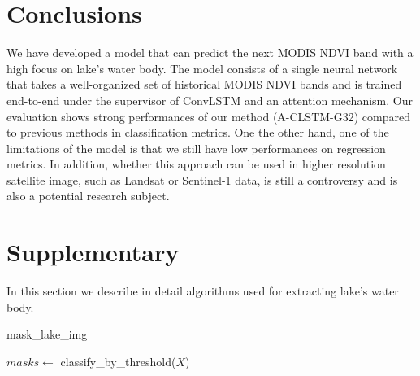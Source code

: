 \section{Conclusions}
We have developed a model that can predict the next MODIS NDVI band with a high focus on lake's water body. The model consists of a single neural network that takes a well-organized set of historical MODIS NDVI bands and is trained end-to-end under the supervisor of ConvLSTM and an attention mechanism. Our evaluation shows strong performances of our method (A-CLSTM-G32) compared to previous methods in classification metrics. One the other hand, one of the limitations of the model is that we still have low performances on regression metrics. In addition, whether this approach can be used in higher resolution satellite image, such as Landsat or Sentinel-1 data, is still a controversy and is also a potential research subject. 


\section{Supplementary}
\label{Supplementary}
In this section we describe in detail algorithms used for extracting lake's water body.

\begin{algorithm}
    \caption{mask\_lake\_img}
    \begin{algorithmic}[1]
        \newline
        \State $masks \gets$ classify\_by\_threshold($X$)
    \end{algorithmic}
\end{algorithm}

